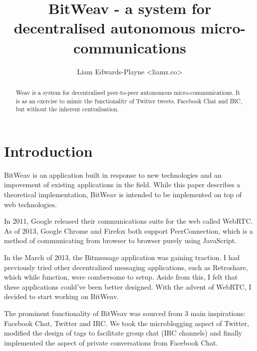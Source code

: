 \documentclass[10pt,a4paper,onecolumn]{article}
\author{Liam Edwards-Playne <liamz.co>}
\title{BitWeav - a system for decentralised autonomous micro-communications}
\begin{document}
\maketitle
\begin{abstract}
Weav is a system for decentralised peer-to-peer autonomous micro-communications. It is as an exercise to mimic the functionality of Twitter tweets, Facebook Chat and IRC, but without the inherent centralisation. 
\end{abstract}

\section{Introduction}
BitWeav is an application built in response to new technologies and an impovement of existing applications in the field. While this paper describes a theoretical implementation, BitWeav is intended to be implemented on top of web technologies. 

In 2011, Google released their communications suite for the web called WebRTC. As of 2013, Google Chrome and Firefox both support PeerConnection, which is a method of communicating from browser to browser purely using JavaScript. 

In the March of 2013, the Bitmessage application was gaining traction. I had previously tried other decentralized messaging applications, such as Retroshare, which while function, were combersome to setup. Aside from this, I felt that these applications could've been better designed. With the advent of WebRTC, I decided to start working on BitWeav. 

The prominent functionality of BitWeav was sourced from 3 main inspirations: Facebook Chat, Twitter and IRC. We took the microblogging aspect of Twitter, modified the design of tags to facilitate group chat (IRC channels) and finally implemented the aspect of private conversations from Facebook Chat. 
\end{document}
